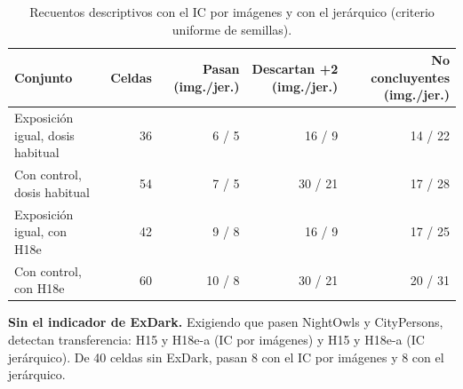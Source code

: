 \begin{table}[H]\centering\small
\caption{Recuentos descriptivos con el IC por imágenes y con el jerárquico (criterio uniforme de semillas).}
\begin{tabular}{@{}lrrrr@{}}\toprule
Conjunto & Celdas & Pasan (img./jer.) & Descartan +2 (img./jer.) & No concluyentes (img./jer.) \\\midrule
Exposición igual, dosis habitual & 36 & 6 / 5 & 16 / 9 & 14 / 22 \\
Con control, dosis habitual & 54 & 7 / 5 & 30 / 21 & 17 / 28 \\
Exposición igual, con H18e & 42 & 9 / 8 & 16 / 9 & 17 / 25 \\
Con control, con H18e & 60 & 10 / 8 & 30 / 21 & 20 / 31 \\
\bottomrule\end{tabular}\end{table}

\noindent\textbf{Sin el indicador de ExDark.} Exigiendo que pasen NightOwls y CityPersons, detectan transferencia: H15 y H18e-a (IC por imágenes) y H15 y H18e-a (IC jerárquico). De 40 celdas sin ExDark, pasan 8 con el IC por imágenes y 8 con el jerárquico.
